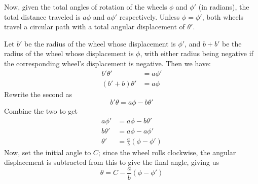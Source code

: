 Now, given the total angles of rotation of the wheels $\phi$ and
$\phi'$ (in radians), the total distance traveled is $a\phi$ and
$a\phi'$ respectively.  Unless $\phi = \phi'$, both wheels travel a
circular path with a total angular displacement of $\theta'$.

Let $b'$ be the radius of the wheel whose displacement is $\phi'$, and
$b + b'$ be the radius of the wheel whose displacement is $\phi$, with
either radius being negative if the corresponding wheel's displacement
is negative.  Then we have:
\begin{align*}
  b'\theta' &= a\phi' \\
  (b' + b)\theta' &= a\phi
\end{align*}
Rewrite the second as
\[b'\theta = a\phi - b\theta' \]
Combine the two to get
\begin{align*}
  a\phi'
  &=
  a\phi - b\theta' \\
  b\theta'
  &=
  a\phi - a\phi' \\
  \theta'
  &=
  \frac{a}{b}(\phi - \phi')
\end{align*}
Now, set the initial angle to $C$; since the wheel rolls clockwise,
the angular displacement is subtracted from this to give the final
angle, giving us
\[\theta = C - \frac{a}{b}(\phi - \phi')\]
